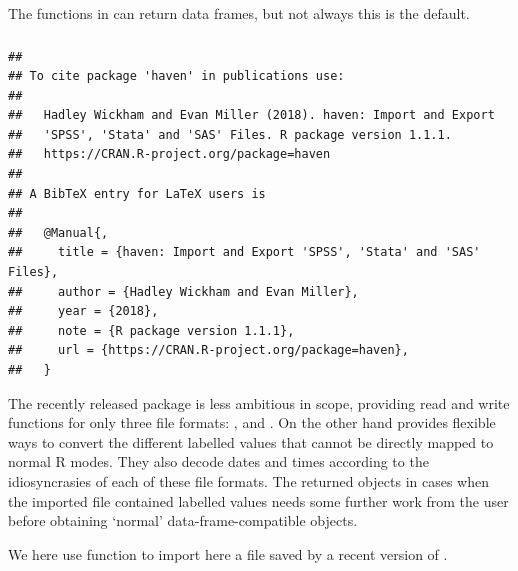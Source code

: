 \documentclass[krantz2]{krantz}\usepackage{knitr}%
\begin{document}
The functions in  can return data frames, but not always this is the default.

\subsubsection[haven]{}

\begin{knitrout}\footnotesize
{}\color{fgcolor}\begin{kframe}
\begin{alltt}
\hlstd{(} \hlstd{=} \hlstd{)}
\end{alltt}
\begin{verbatim}
## 
## To cite package 'haven' in publications use:
## 
##   Hadley Wickham and Evan Miller (2018). haven: Import and Export
##   'SPSS', 'Stata' and 'SAS' Files. R package version 1.1.1.
##   https://CRAN.R-project.org/package=haven
## 
## A BibTeX entry for LaTeX users is
## 
##   @Manual{,
##     title = {haven: Import and Export 'SPSS', 'Stata' and 'SAS' Files},
##     author = {Hadley Wickham and Evan Miller},
##     year = {2018},
##     note = {R package version 1.1.1},
##     url = {https://CRAN.R-project.org/package=haven},
##   }
\end{verbatim}
\end{kframe}
\end{knitrout}

The recently released package  is less ambitious in scope, providing read and write functions for only three file formats: ,  and . On the other hand  provides flexible ways to convert the different labelled values that cannot be directly mapped to normal R modes. They also decode dates and times according to the idiosyncrasies of each of these file formats. The returned  objects in cases when the imported file contained labelled values needs some further work from the user before obtaining `normal' data-frame-compatible  objects.

We here use function  to import here a  file saved by a recent version of .
\end{document}
